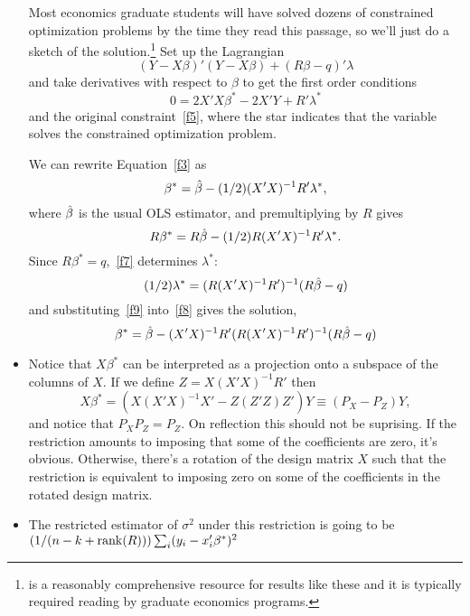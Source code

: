 \begin{itemize}[leftmargin=0pt]
  Most economics graduate students will have solved dozens of
  constrained optimization problems by the time they read this
  passage, so we'll just do a sketch of the
  solution.\footnote{\citet{SB94} is a reasonably comprehensive
    resource for results like these and it is typically required
    reading by graduate economics programs.}  Set up the Lagrangian
  \begin{equation}\label{f6}
    (Y - X\beta)'(Y - X\beta) + (R\beta - q)' \lambda
  \end{equation}
  and take derivatives with respect to $\beta$ to get the first order
  conditions
  \begin{equation}\label{f3}
    0 = 2X'X \beta^* - 2 X'Y + R'\lambda^*
  \end{equation}
  and the original constraint~\eqref{f5}, where the star indicates
  that the variable solves the constrained optimization problem.
  
  We can rewrite Equation~\eqref{f3} as
  \begin{equation}\label{f8}
    \beta^* = \betah - (1/2) (X'X)^{-1} R'\lambda^*,
  \end{equation}
  where $\hat{\beta}$ is the usual OLS estimator, and premultiplying by $R$
  gives
  \begin{equation}\label{f7}
    R\beta^* = R \betah - (1/2) R (X'X)^{-1} R'\lambda^*.
  \end{equation}
  Since $R\beta^* = q$,~\eqref{f7} determines $\lambda^*$:
  \begin{equation}\label{f9}
    (1/2) \lambda^* = (R (X'X)^{-1} R')^{-1} (R \betah - q)
  \end{equation}
  and substituting~\eqref{f9} into~\eqref{f8} gives the solution,
  \begin{equation}\label{f10}
    \beta^* = \betah - (X'X)^{-1} R' (R (X'X)^{-1} R')^{-1} (R \betah - q)
  \end{equation}

\item Notice that $X\beta^*$ can be interpreted as a projection onto a
  subspace of the columns of $X$.  If we define $Z = X (X'X)^{-1} R'$
  then
  \begin{equation*}
    X \beta^* = (X(X'X)^{-1}X' - Z(Z'Z)Z') Y \equiv (P_X - P_Z) Y,
  \end{equation*}
  and notice that $P_X P_Z = P_Z$.  On reflection this should not be
  suprising.  If the restriction amounts to imposing that some of the
  coefficients are zero, it's obvious.  Otherwise, there's a rotation
  of the design matrix $X$ such that the restriction is equivalent to
  imposing zero on some of the coefficients in the rotated design
  matrix.

\item The restricted estimator of $\sigma^2$ under this restriction is going
  to be $(1/(n - k + \operatorname{rank}(R))) \sum_i (y_i - x_i'\beta^*)^2$

\end{itemize}

